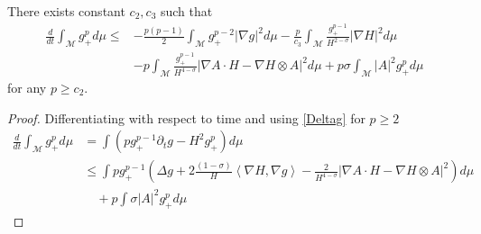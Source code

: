 \begin{lemma}\label{dgdt}
   There exists constant $ c_{2} , c_{3}$ such that 
    \begin{align}
        \frac{d}{dt}\int_{ \mathcal{M}} g_{+}^{p} d \mu \le& - \frac{p(p-1)}{2} \int_{ \mathcal{M}} g_{+}^{p-2}| \nabla g|^{2}d \mu - \frac{p}{c_{3}} \int_{ \mathcal{M}} \frac{g_{+}^{p-1}}{H^{2 -\sigma}}|\nabla H|^{2} d \mu \nonumber\\
        & - p \int_{ \mathcal{M}} \frac{g_{+}^{p-1}}{H^{4-\sigma}}| \nabla A \cdot H - \nabla H \otimes A|^{2} d \mu + p \sigma \int_{ \mathcal{ M}}|A|^{2} g_{+}^{p} d \mu \label{Lpfirst}
    \end{align}
   for any $ p \ge c_{2} $.
\end{lemma}

\begin{proof}
    Differentiating with respect to time and using \cref{Deltag} for $ p \ge 2 $
    \begin{align}
        \frac{d}{dt} \int_{ \mathcal{M}} g_{+}^{p} d \mu  & =  \int \left(pg_{+}^{p-1} \partial_{t}g - H^{2}g_{+}^{p}\right) d \mu \nonumber \\
        & \le \int pg_{+}^{p-1}\left( \Delta g + 2\frac{(1-\sigma)}{H}\left< \nabla H, \nabla g\right>  - \frac{2}{H^{4-\sigma}}| \nabla A \cdot H - \nabla H \otimes A|^{2}\right)d \mu  \nonumber\\
        & \quad + p \int \sigma |A|^{2} g_{+}^{p} d \mu\label{Lpg}
    \end{align}


\end{proof}
